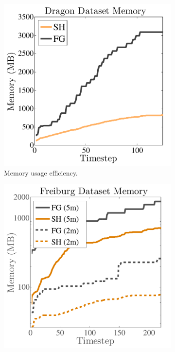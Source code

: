 \documentclass[conference]{IEEEtran}
\begin{document}
\begin{figure}[t!]
  \centering
	 \begin{subfigure}[b]{0.22\linewidth} \centering
			\includegraphics[width=1.0\textwidth]{img/memoryusage.pdf}
			 \caption{Memory usage efficiency.} 
			 \label{fig:memory_data}
		 \end{subfigure}  
		  \begin{subfigure}[b]{0.22\linewidth} \centering
			\includegraphics[width=1.0\textwidth]{img/memoryusage2.pdf}

\end{subfigure}
\end{figure}
\end{document}
